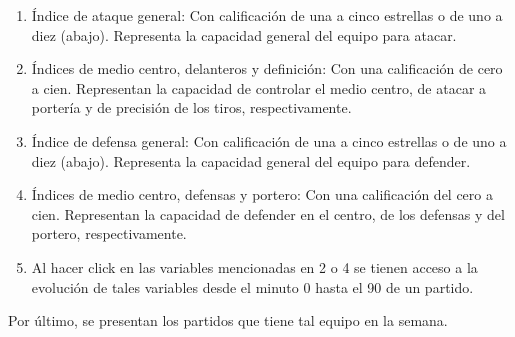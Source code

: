\begin{itemize}
\begin{enumerate}
\item Índice de ataque general: Con calificación de una a cinco estrellas o de uno a diez (abajo). Representa la capacidad general del equipo para atacar.
\item Índices de medio centro, delanteros y definición: Con una calificación de cero a cien. Representan la capacidad de controlar el medio centro, de atacar a portería y de precisión de los tiros, respectivamente.
\item Índice de defensa general: Con calificación de una a cinco estrellas o de uno a diez (abajo). Representa la capacidad general del equipo para defender.
\item Índices de medio centro, defensas y portero: Con una calificación del cero a cien. Representan la capacidad de defender en el centro, de los defensas y del portero, respectivamente.
\item Al hacer click en las variables mencionadas en 2 o 4 se tienen acceso a la evolución de tales variables desde el minuto 0 hasta el 90 de un partido.
\end{enumerate}

Por último, se presentan los partidos que tiene tal equipo en la semana.

\end{itemize}

